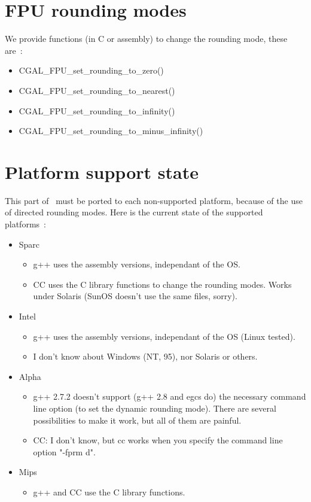 \section{FPU rounding modes}

We provide functions (in C or assembly) to change the rounding mode, these are~:
\begin{itemize}
\item CGAL\_FPU\_set\_rounding\_to\_zero()
\item CGAL\_FPU\_set\_rounding\_to\_nearest()
\item CGAL\_FPU\_set\_rounding\_to\_infinity()
\item CGAL\_FPU\_set\_rounding\_to\_minus\_infinity()
\end{itemize}

\section{Platform support state}

This part of \cgal\ must be ported to each non-supported platform, because of
the use of directed rounding modes.  Here is the current state of the
supported platforms~:

\begin{itemize}
\item Sparc
\begin{itemize}
\item g++ uses the assembly versions, independant of the OS.
\item CC uses the C library functions to change the rounding modes.  Works
      under Solaris (SunOS doesn't use the same files, sorry).
\end{itemize}
\item Intel
\begin{itemize}
\item g++ uses the assembly versions, independant of the OS (Linux tested).
\item I don't know about Windows (NT, 95), nor Solaris or others.
\end{itemize}
\item Alpha
\begin{itemize}
\item g++ 2.7.2 doesn't support (g++ 2.8 and egcs do) the necessary command line
	option (to set the dynamic rounding mode).  There are several
	possibilities to make it work, but all of them are painful.
\item CC: I don't know, but cc works when you specify the command line option
      "-fprm d".
\end{itemize}
\item Mips
\begin{itemize}
\item g++ and CC use the C library functions.
\end{itemize}
\end{itemize}


